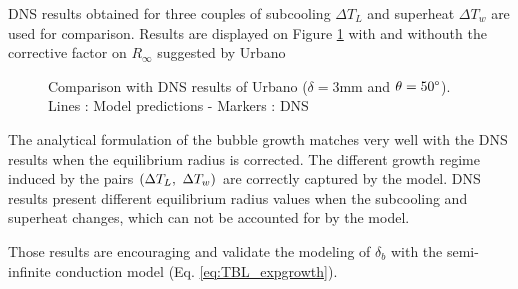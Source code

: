 \npar

DNS results obtained for three couples of subcooling $\Delta T_{L}$ and superheat $\Delta T_{w}$ are used for comparison. Results are displayed on Figure \ref{fig:growth_comp_urbano} with and withouth the corrective factor on $R_{\infty}$ suggested by Urbano \etal

\begin{figure}[h!]
\caption{Comparison with DNS results of Urbano \etal \cite{urbano_direct_2019} ($\delta=3$mm and $\theta=50\degree$). Lines : Model predictions - Markers : DNS }
\label{fig:growth_comp_urbano}
\end{figure}

The analytical formulation of the bubble growth matches very well with the DNS results when the equilibrium radius is corrected. The different growth regime induced by the pairs $\left( \Delta T_{L},\ \Delta T_{w} \right)$ are correctly captured by the model. DNS results present different equilibrium radius values when the subcooling and superheat changes, which can not be accounted for by the model.

\npar

\begin{remark*}{}
Those results are encouraging and validate the modeling of $\delta_{b}$ with the semi-infinite conduction model (Eq. \ref{eq:TBL_expgrowth}).
\end{remark*}




